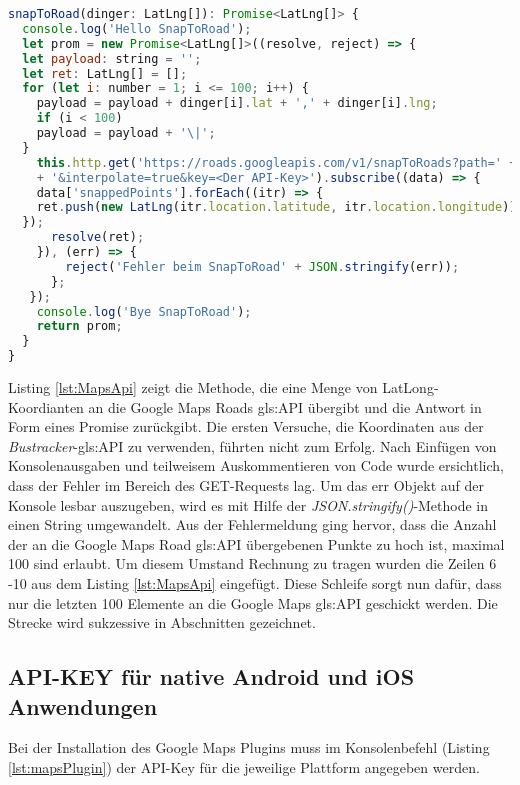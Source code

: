 \begin{lstlisting}[float, language= JavaScript, caption= Verwendung der RoadsAPI durch \emph{Bustracker}, label=lst:MapsApi]
snapToRoad(dinger: LatLng[]): Promise<LatLng[]> { 
  console.log('Hello SnapToRoad');
  let prom = new Promise<LatLng[]>((resolve, reject) => {
  let payload: string = '';
  let ret: LatLng[] = [];
  for (let i: number = 1; i <= 100; i++) {
    payload = payload + dinger[i].lat + ',' + dinger[i].lng;
    if (i < 100)
    payload = payload + '\|';
  }
    this.http.get('https://roads.googleapis.com/v1/snapToRoads?path=' + payload
    + '&interpolate=true&key=<Der API-Key>').subscribe((data) => {
    data['snappedPoints'].forEach((itr) => {
    ret.push(new LatLng(itr.location.latitude, itr.location.longitude));
  });
      resolve(ret);
    }), (err) => {
        reject('Fehler beim SnapToRoad' + JSON.stringify(err));
      };
   });
    console.log('Bye SnapToRoad');
    return prom;
  }
}
\end{lstlisting}

Listing \ref{lst:MapsApi} zeigt die Methode, die eine Menge von LatLong-Koordianten an die Google Maps Roads \gls{gls:API} übergibt und die Antwort in Form eines Promise zurückgibt. Die ersten Versuche, die Koordinaten aus der \emph{Bustracker}-\gls{gls:API} zu verwenden, führten nicht zum Erfolg. Nach Einfügen von Konsolenausgaben und teilweisem Auskommentieren von Code wurde ersichtlich, dass der Fehler im Bereich des GET-Requests lag. Um das \glqq err \grqq{} Objekt auf der Konsole lesbar auszugeben, wird es mit Hilfe der \emph{JSON.stringify()}-Methode in einen String umgewandelt. Aus der Fehlermeldung ging hervor, dass die Anzahl der an die Google Maps Road \gls{gls:API} übergebenen Punkte zu hoch ist, maximal 100 sind erlaubt. Um diesem Umstand Rechnung zu tragen wurden die Zeilen 6 -10 aus dem Listing \ref{lst:MapsApi} eingefügt. Diese Schleife sorgt nun dafür, dass nur die letzten 100 Elemente an die Google Maps \gls{gls:API} geschickt werden. Die Strecke wird sukzessive in Abschnitten gezeichnet.

\subsection{API-KEY für native Android und iOS Anwendungen}
Bei der Installation des Google Maps Plugins \cite{GoogleMapsPluginDoku} muss im Konsolenbefehl (Listing \ref{lst:mapsPlugin}) der API-Key für die jeweilige Plattform angegeben werden.



